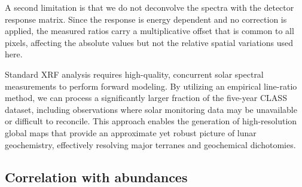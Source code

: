 \documentclass[twocolumn,linenumbers]{aastex631}
\newcommand{\revone}[1]{#1}
\newcommand{\revtwo}[1]{#1}
\begin{document}
\revtwo{A second limitation is that we do not deconvolve the spectra with the detector response matrix. Since the response is energy dependent and no correction is applied, the measured ratios carry a multiplicative offset that is common to all pixels, affecting the absolute values but not the relative spatial variations used here.}

\revone{Standard XRF analysis requires high-quality, concurrent solar spectral measurements to perform forward modeling. By utilizing an empirical line-ratio method, we can process a significantly larger fraction of the five-year CLASS dataset, including observations where solar monitoring data may be unavailable or difficult to reconcile. This approach enables the generation of high-resolution global maps that provide an approximate yet robust picture of lunar geochemistry, effectively resolving major terranes and geochemical dichotomies.}

\subsection{Correlation with abundances}\label{sec:corr_abund}





\end{document}
